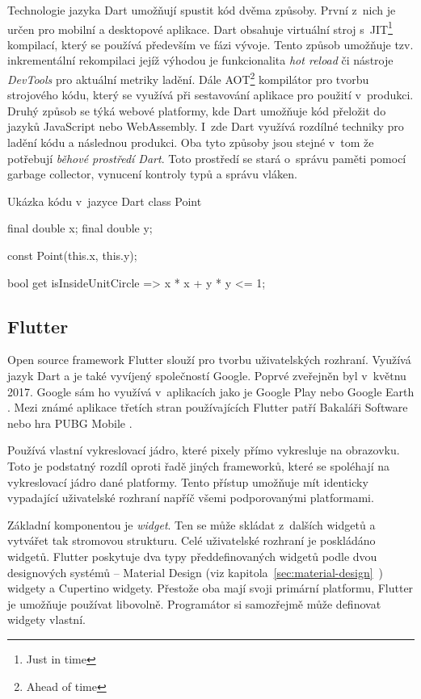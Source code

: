 \documentclass[
  biblatex,
  figures=true,
  tables=false,
  glossaries,
  index
]{kidiplom}
\begin{document}
Technologie jazyka Dart umožňují spustit kód dvěma způsoby. První z~nich je určen pro mobilní a desktopové aplikace. Dart obsahuje virtuální stroj s~JIT\footnote{Just in time} kompilací, který se používá především ve fázi vývoje. Tento způsob umožňuje tzv. inkrementální rekompilaci jejíž výhodou je funkcionalita \textit{hot reload} či nástroje \textit{DevTools} pro aktuální metriky ladění. Dále AOT\footnote{Ahead of time} kompilátor pro tvorbu strojového kódu, který se využívá při sestavování aplikace pro použití v~produkci. Druhý způsob se týká webové platformy, kde Dart umožňuje kód přeložit do jazyků JavaScript nebo WebAssembly. I~zde Dart využívá rozdílné techniky pro ladění kódu a následnou produkci. Oba tyto způsoby jsou stejné v~tom že potřebují \textit{běhové prostředí Dart}. Toto prostředí se stará o~správu paměti pomocí garbage collector, vynucení kontroly typů a správu vláken.

\begin{kicode}{}{}{Ukázka kódu v~jazyce Dart}
class Point {
  final double x;
  final double y;

  const Point(this.x, this.y);

  bool get isInsideUnitCircle => x * x + y * y <= 1;
}
\end{kicode}

\subsection{Flutter}
Open source framework Flutter \cite{flutter} slouží pro tvorbu uživatelských rozhraní. Využívá jazyk Dart a je také vyvíjený společností Google. Poprvé zveřejněn byl v~květnu 2017. Google sám ho využívá v~aplikacích jako je Google Play nebo Google Earth \cite{flutter-showcase}. Mezi známé aplikace třetích stran používajících Flutter patří Bakaláři Software nebo hra PUBG Mobile \cite{flutter-showcase}.

Používá vlastní vykreslovací jádro, které pixely přímo vykresluje na obrazovku. Toto je podstatný rozdíl oproti řadě jiných frameworků, které se spoléhají na vykreslovací jádro dané platformy. Tento přístup umožňuje mít identicky vypadající uživatelské rozhraní napříč všemi podporovanými platformami.

Základní komponentou je \textit{widget}. Ten se může skládat z~dalších widgetů a vytvářet tak stromovou strukturu. Celé uživatelské rozhraní je poskládáno widgetů. Flutter poskytuje dva typy předdefinovaných widgetů podle dvou designových systémů -- Material Design (viz kapitola~\ref{sec:material-design}~) widgety a Cupertino widgety. Přestože oba mají svoji primární platformu, Flutter je umožňuje používat libovolně. Programátor si samozřejmě může definovat widgety vlastní.
\end{document}
